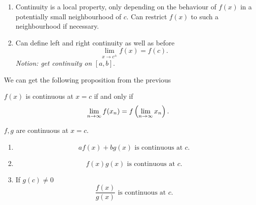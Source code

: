 \documentclass[10pt, a4paper]{article}
\begin{document}
\begin{remark}\phantom{}
    \begin{enumerate}[label = (\roman*)]
        \item Continuity is a local property,
        only depending on the behaviour of $f(x)$ in a potentially small neighbourhood of $c$.
        Can restrict $f(x)$ to such a neighbourhood if necessary.

        \item Can define left and right continuity as well as before
        \[
        \lim_{x \rightarrow c ^ {\pm}}f(x) = f(c).
        \]
        \textit{Notion:
        get continuity on $[a, b]$}.
    \end{enumerate}
\end{remark}

We can get the following proposition from the previous
\begin{proposition}
    $f(x)$ is continuous at $x = c$ if and only if
    \[
    \lim_{n \rightarrow \infty} f(x_n) = f\left(\lim_{n \rightarrow \infty} x_n\right).
    \]
\end{proposition}

\begin{theorem}
    $f, g$ are continuous at $x = c$.
    \begin{enumerate}[label = (\roman*)]
        \item
        \[
        af(x) + bg(x) \text{ is continuous at } c.
        \]

        \item
        \[
        f(x)g(x) \text{ is continuous at } c.
        \]

        \item If $g(c) \neq 0$
        \[
        \frac{f(x)}{g(x)} \text{ is continuous at } c.
        \]
    \end{enumerate}
\end{theorem}
\end{document}
